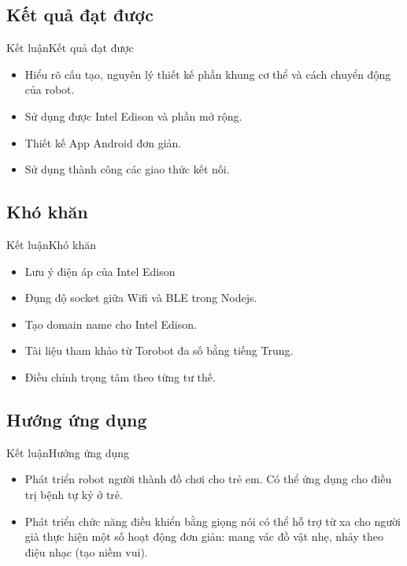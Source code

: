 \documentclass[compress, blue, 13pt,hyperref={pdfpagemode=FullScreen}]{beamer}
\begin{document}
\subsection{Kết quả đạt được}
\begin{frame}{Kết luận}{Kết quả đạt được}
\begin{itemize}
\item Hiểu rõ cấu tạo, nguyên lý thiết kế phần khung cơ thể và cách chuyển động của robot.
\item Sử dụng được Intel Edison và phần mở rộng.
\item Thiết kế App Android đơn giản.
\item Sử dụng thành công các giao thức kết nối.
\end{itemize}
\end{frame}
\subsection{Khó khăn}
\begin{frame}{Kết luận}{Khó khăn}
\begin{itemize}
\item Lưu ý điện áp của Intel Edison
\item Đụng độ socket giữa Wifi và BLE trong Nodejs.
\item Tạo domain name cho Intel Edison.
\item Tài liệu tham khảo từ Torobot đa số bằng tiếng Trung.
\item Điều chỉnh trọng tâm theo từng tư thế.
\end{itemize}
\end{frame}

\subsection{Hướng ứng dụng}
\begin{frame}{Kết luận}{Hướng ứng dụng}
\begin{itemize}
\item Phát triển robot người thành đồ chơi cho trẻ em. Có thể ứng dụng cho điều trị bệnh tự kỷ ở trẻ.
\item Phát triển chức năng điều khiển bằng giọng nói có thể hỗ trợ từ xa cho người già thực hiện một số hoạt động đơn giản: mang vác đồ vật nhẹ, nhảy theo điệu nhạc (tạo niềm vui).
\end{itemize}
\end{frame}
\end{document}
